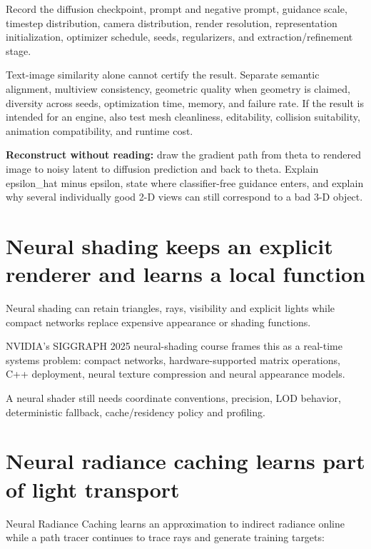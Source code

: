 Record the diffusion checkpoint, prompt and negative prompt, guidance scale, timestep distribution, camera distribution, render resolution, representation initialization, optimizer schedule, seeds, regularizers, and extraction/refinement stage.

Text-image similarity alone cannot certify the result. Separate semantic alignment, multiview consistency, geometric quality when geometry is claimed, diversity across seeds, optimization time, memory, and failure rate. If the result is intended for an engine, also test mesh cleanliness, editability, collision suitability, animation compatibility, and runtime cost.

\textbf{Reconstruct without reading:} draw the gradient path from theta to rendered image to noisy latent to diffusion prediction and back to theta. Explain epsilon\_hat minus epsilon, state where classifier-free guidance enters, and explain why several individually good 2-D views can still correspond to a bad 3-D object.

\section{Neural shading keeps an explicit renderer and learns a local function}\label{04-visual-computing-ii-ch035-neural-shading-keeps-an-explicit-renderer-and-learns-a-local-function}

Neural shading can retain triangles, rays, visibility and explicit lights while compact networks replace expensive appearance or shading functions.

NVIDIA's SIGGRAPH 2025 neural-shading course frames this as a real-time systems problem: compact networks, hardware-supported matrix operations, C++ deployment, neural texture compression and neural appearance models.

A neural shader still needs coordinate conventions, precision, LOD behavior, deterministic fallback, cache/residency policy and profiling.

\section{Neural radiance caching learns part of light transport}\label{04-visual-computing-ii-ch035-neural-radiance-caching-learns-part-of-light-transport}

Neural Radiance Caching learns an approximation to indirect radiance online while a path tracer continues to trace rays and generate training targets:

